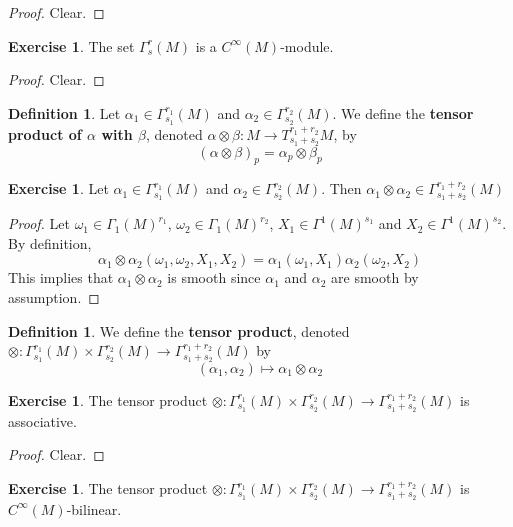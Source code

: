 \documentclass[12pt]{amsart}
\theoremstyle{definition}
\newtheorem{defn}[definition]{Definition}
\newtheorem{ex}[definition]{Exercise}
\newcommand{\al}{\alpha}
\newcommand{\Gam}{\Gamma}
\newcommand{\bet}{\beta}
\newcommand{\om}{\omega}
\begin{document}
	\begin{proof}
	Clear.
	\end{proof}
	
	\begin{ex}
	The set $\Gam^r_s(M)$ is a $C^{\infty}(M)$-module.
	\end{ex}
	
	\begin{proof}
	Clear.
	\end{proof}
	
	\begin{defn}
	Let $\al_1 \in \Gam^{r_1}_{s_1}(M)$ and $\al_2 \in \Gam^{r_2}_{s_2}(M)$. We define the \textbf{tensor product of $\al$ with $\bet$}, denoted $\al \otimes \bet : M \rightarrow T^{r_1 + r_2}_{s_1 + s_2}M$, by $$(\al \otimes \bet)_p = \al_p \otimes \bet_p$$
	\end{defn}
	
	\begin{ex}
	Let $\al_1 \in \Gam^{r_1}_{s_1}(M)$ and $\al_2 \in \Gam^{r_2}_{s_2}(M)$. Then $\al_1 \otimes \al_2 \in \Gam^{r_1 + r_2}_{s_1 + s_2}(M)$
	\end{ex}
	
	\begin{proof}
	Let $\om_1 \in \Gam_1(M)^{r_1}$, $\om_2 \in \Gam_1(M)^{r_2}$, $X_1 \in \Gam^1(M)^{s_1}$ and $X_2 \in \Gam^1(M)^{s_2}$. By definition,
	$$\al_1 \otimes \al_2 (\om_1, \om_2, X_1, X_2) = \al_1(\om_1, X_1) \al_2(\om_2, X_2)$$
	This implies that $\al_1 \otimes \al_2$ is smooth since $\al_1$ and $\al_2$ are smooth by assumption.
	\end{proof}
	
	\begin{defn}
	We define the \textbf{tensor product}, denoted $\otimes : \Gam^{r_1}_{s_1}(M) \times \Gam^{r_2}_{s_2}(M) \rightarrow \Gam^{r_1+r_2}_{s_1+s_2}(M)$ by $$(\al_1, \al_2) \mapsto \al_1 \otimes \al_2 $$
	\end{defn}	
	
	\begin{ex}
	The tensor product $\otimes : \Gam^{r_1}_{s_1}(M) \times \Gam^{r_2}_{s_2}(M) \rightarrow \Gam^{r_1+r_2}_{s_1+s_2}(M)$ is associative.
	\end{ex}
	
	\begin{proof}
	Clear.
	\end{proof}
	
	\begin{ex}
	The tensor product $\otimes : \Gam^{r_1}_{s_1}(M) \times \Gam^{r_2}_{s_2}(M) \rightarrow \Gam^{r_1+r_2}_{s_1+s_2}(M)$ is $C^{\infty}(M)$-bilinear.
	\end{ex}
	
\end{document}
